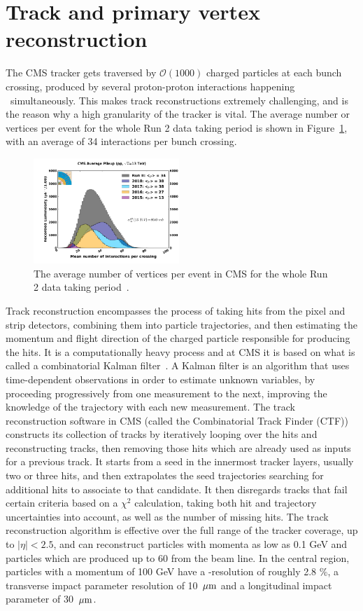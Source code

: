 \section{Track and primary vertex reconstruction}
The CMS tracker gets traversed by $\mathcal{O}(1000)$ charged particles at each bunch crossing, produced by several proton-proton interactions happening ~simultaneously. This makes track reconstructions extremely challenging, and is the reason why a high granularity of the tracker is vital.
The average number or vertices per event for the whole Run 2 data taking period is shown in Figure~\ref{fig:objreco:pu}, with an average of 34 interactions per bunch crossing.
\begin{figure}[h] 
    \centering
    \includegraphics[width=0.49\textwidth]{figures/event_reconstruction/pu.pdf}
    \caption{The average number of vertices per event in CMS for the whole Run 2 data taking period~\cite{CMSlumi}.}
    \label{fig:objreco:pu}
\end{figure}
Track reconstruction encompasses the process of taking hits from the pixel and strip detectors, combining them into particle trajectories, and then estimating the momentum and flight direction of the charged particle responsible for producing the hits. It is a computationally heavy process and at CMS it is based on what is called a combinatorial Kalman filter~\cite{BILLOIR1989390}. A Kalman filter is an algorithm that uses time-dependent observations in order to estimate unknown variables, by proceeding progressively from one measurement to the next, improving the knowledge of the
trajectory with each new measurement. The track reconstruction software in CMS (called the Combinatorial Track Finder (CTF)) constructs its collection of tracks by iteratively looping over the hits and reconstructing tracks, then removing those hits which are already used as inputs for a previous track. It starts from a seed in the innermost tracker layers, usually two or three hits, and then extrapolates the seed trajectories searching for additional hits to associate to that candidate. It then disregards tracks that fail certain criteria  based on a $\chi^2$ calculation, taking both hit and trajectory uncertainties into account, as well as the number of missing hits.
The track reconstruction algorithm is effective over the full range of the tracker coverage, up to $|\eta|<2.5$, and can reconstruct particles with momenta as low as 0.1 GeV and particles which are produced up to 60 \cm from the beam line. In the central region, particles with a momentum of 100 GeV have a \PT-resolution of roughly 2.8 \%, a transverse impact parameter resolution of 10 $\,\mu\text{m}$ and a longitudinal impact parameter of 30 $\,\mu\text{m}$. 


